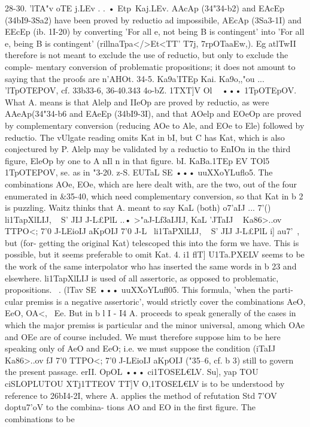 {{{{{28-30. 'lTA"v oTE j.LEv . . • Etp~Kaj.LEv. AAcAp (34"34-b2) and
EAcEp (34bI9-3Sa2) have been proved by reductio ad impossibile,
AEcAp (3Sa3-1I) and EEcEp (ib. 1I-20) by converting 'For all
e, not being B is contingent' into 'For all e, being B is contingent'
(rillnaTpa</>Et<TT}' T7j, 7rpOTaaEw,). Eg atlTwII therefore is not meant
to exclude the use of reductio, but only to exclude the comple-
mentary conversion of problematic propositions; it does not
amount to saying that the proofs are n'AHOt.
34-5. Ka9a'ITEp Kai. Ka9o,,"ou ... 'lTpOTEPOV, cf. 33b33-6, 36-40.343
4o-bZ. 1TXT]V Ol ~ ••• 1TpOTEpOV. What A. means is that
Alelp and IIeOp are proved by reductio, as were AAeAp(34"34-b6}
and EAeEp (34bI9-3I), and that AOelp and EOeOp are proved by
complementary conversion (reducing AOe to Ale, and EOe to
Ele) followed by reductio. The vUlgate reading omits Kat in bI,
but C has Kat, which is also conjectured by P.
Alelp may be validated by a reductio to EnIOn in the third
figure, EleOp by one to A nIl n in that figure.
bI. KaBa.1TEp EV TOl5 1TpOTEPOV, se. as in "3-20.
z-S. EUTaL SE ••• uuXXoYLuflo5. The combinations AOe, EOe,
which are here dealt with, are the two, out of the four enumerated
in &35-40, which need complementary conversion, so that Kat
in b 2 is puzzling. Waitz thinks that A. meant to say KaL (both)
o7'aIJ ... 7'() li1TapXlLIJ, ~ S' JIJ J-L£PlL ..• >"aJ-Lf3aIJIJ, KaL 'JTaIJ ~ Ka86>..ov
TTPO<; 7'0 J-LEi{oIJ aKpOIJ 7'0 J-L~ li1TaPXlLIJ, ~ S' JIJ J-L£PlL i] au7'~, but (for-
getting the original Kat) telescoped this into the form we have.
This is possible, but it seems preferable to omit Kat.
4. i1 flT] U1Ta.PXELV seems to be the work of the same interpolator
who has inserted the same words in b 23 and elsewhere. li1TapXlLIJ
is used of all assertoric, as opposed to problematic, propositions.
~. (lTav SE ••• uuXXoYLufl05. This formula, 'when the parti-
cular premiss is a negative assertoric', would strictly cover the
combinations AeO, EeO, OA<, ~Ee. But in b l I - I4 A. proceeds
to speak generally of the cases in which the major premiss is
particular and the minor universal, among which OAe and OEe
are of course included. We must therefore suppose him to be here
speaking only of AeO and EeO; i.e. we must suppose the condition
(iTaIJ Ka86>..ov fJ 7'0 TTPO<; 7'0 J-LEi{oIJ aKpOIJ ("35--6, cf. b 3) still to govern
the present passage.
erII. OpOL ••• ci1TOSEL€LV. Su], yap TOU ciSLOPLUTOU XTj1TTEOV TT]V
O,1TOSEL€LV is to be understood by reference to 26bI4-2I, where A.
applies the method of refutation Std 7'OV doptu7'oV to the combina-
tions AO and EO in the first figure. The combinations to be
}}}}}
